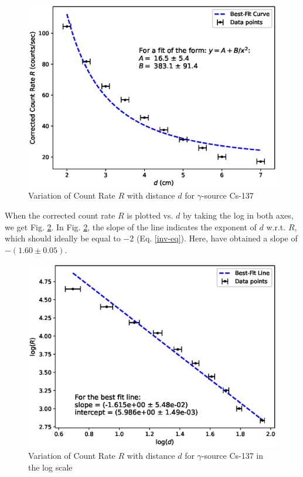 \begin{figure}
    \centering
    \includegraphics[width=1\columnwidth]{images/inv1.eps}
    \caption{Variation of Count Rate $R$ with distance $d$ for $\gamma$-source Cs-137}
    \label{g3}
\end{figure}

When the corrected count rate $R$ is plotted vs. $d$ by taking the log in both axes, we get Fig. \ref{g4}.
In Fig. \ref{g4}, the slope of the line indicates the exponent of $d$ w.r.t. $R$, which should ideally be equal to $-2$ (Eq. \ref{inv-eq}). Here, have obtained a slope of $-(1.60 \pm 0.05)$.
\begin{figure}
    \centering
    \includegraphics[width=1\columnwidth]{images/inv2.eps}
    \caption{Variation of Count Rate $R$ with distance $d$ for $\gamma$-source Cs-137 in the log scale}
    \label{g4}
\end{figure}

